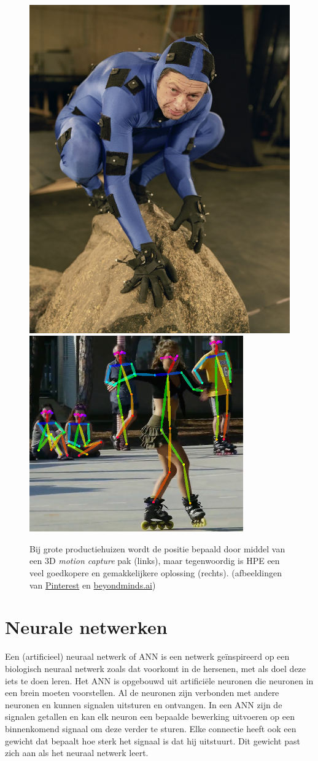 \documentclass[a4paper,twoside,kulak]{kulakreport}
\begin{document}
	\begin{figure}[H]
		\includegraphics[width=.4\textwidth]{3D_motion_capture}
		\includegraphics[width=.55\textwidth]{HPE_voorbeeld}
		\caption{Bij grote productiehuizen wordt de positie bepaald door middel van een 3D \emph{motion capture} pak (links), maar tegenwoordig is HPE een veel goedkopere en gemakkelijkere oplossing (rechts).
		(afbeeldingen van \href{https://www.pinterest.com/pin/718324209297102981/}{Pinterest} en \href{https://beyondminds.ai/an-overview-of-human-pose-estimation-with-deep-learning/}{beyondminds.ai})}
		\label{3D_pak}
	\end{figure}
\section{Neurale netwerken}
Een (artificieel) neuraal netwerk of ANN is een netwerk geïnspireerd op een biologisch neuraal netwerk zoals dat voorkomt in de hersenen, met als doel deze iets te doen leren. Het ANN is opgebouwd uit artificiële neuronen die neuronen in een brein moeten voorstellen. Al de neuronen zijn verbonden met andere neuronen en kunnen signalen uitsturen en ontvangen. In een ANN zijn de signalen getallen en kan elk neuron een bepaalde bewerking uitvoeren op een binnenkomend signaal om deze verder te sturen. Elke connectie heeft ook een gewicht dat bepaalt hoe sterk het signaal is dat hij uitstuurt. Dit gewicht past zich aan als het neuraal netwerk leert. 
\end{document}
